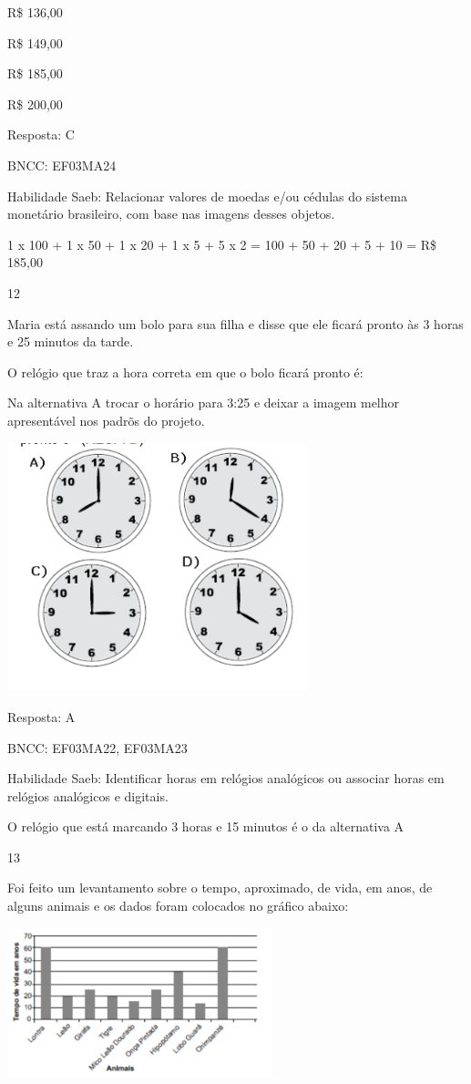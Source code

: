 \begin{escolha}
{\begin{escolha}
{\begin{escolha}
\item
  R\$ 136,00
\item
  R\$ 149,00
\item
  R\$ 185,00
\item
  R\$ 200,00
\end{escolha}

Resposta: C

BNCC: EF03MA24

Habilidade Saeb: Relacionar valores de moedas e/ou cédulas do sistema
monetário brasileiro, com base nas imagens desses objetos.

1 x 100 + 1 x 50 + 1 x 20 + 1 x 5 + 5 x 2 = 100 + 50 + 20 + 5 + 10 = R\$
185,00

\num{12}

Maria está assando um bolo para sua filha e disse que ele ficará pronto
às 3 horas e 25 minutos da tarde.

O relógio que traz a hora correta em que o bolo ficará pronto é:

Na alternativa A trocar o horário para 3:25 e deixar a imagem melhor
apresentável nos padrõs do projeto.

\includegraphics[width=3.44197in,height=2.84191in]{media/image126.png}

Resposta: A

BNCC: EF03MA22, EF03MA23

Habilidade Saeb: Identificar horas em relógios analógicos ou associar
horas em relógios analógicos e digitais.

O relógio que está marcando 3 horas e 15 minutos é o da alternativa A

\num{13}

Foi feito um levantamento sobre o tempo, aproximado, de vida, em anos,
de alguns animais e os dados foram colocados no gráfico abaixo:

\includegraphics[width=3.02451in,height=1.70004in]{media/image127.png}

}
\end{escolha}}
\end{escolha}
